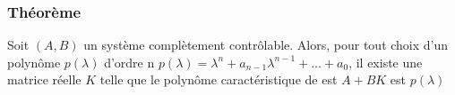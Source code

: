 \documentclass[resume]{subfiles}
\begin{document}
\subsubsection{Théorème}

Soit $(A, B)$ un système complètement contrôlable. Alors, pour tout choix d'un polynôme $p (\lambda)$ d'ordre n $p (\lambda) = \lambda^n + a_{n-1}\lambda^{n-1} +...+ a_0$,
il existe une matrice réelle $K$ telle que le polynôme caractéristique de est $A + BK$ est $p (\lambda)$ 
\end{document}
